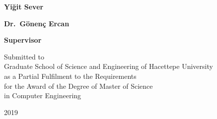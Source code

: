 \documentclass[
12pt, %
english, %
onehalfspacing, %
nolistspacing, %
parskip, %
nohyperref, %
headsepline, %
consistentlayout, %
]{MastersDoctoralThesis} %
\author{Yiğit \textsc{Sever}} %
\newcommand{\titletitlesize}{\fontsize{16pt}{18pt}\selectfont}
\begin{document}
\frontmatter %

\pagestyle{plain} %


\begin{titlepage}
\begin{center}
\vspace*{2\baselineskip} %
{\bfseries \titletitlesize{\ttitle}\par} %
\vspace*{3\baselineskip} %
{\bfseries \titletitlesize{Çift Dilli Kelime Temsilleri ile Sözlük Eşlenmesi}\par} %
\vspace*{3\baselineskip} %
{\bfseries Yiğit Sever\par}
\vspace*{3\baselineskip} %
{\bfseries Dr.~Gönenç Ercan\par} %
{\bfseries Supervisor}

\vspace*{3\baselineskip} %

Submitted to\\
Graduate School of Science and Engineering of Hacettepe University\\
as a Partial Fulfilment to the Requirements\\
for the Award of the Degree of Master of Science\\
in Computer Engineering

\vspace*{3\baselineskip} %

2019

\end{center}
\end{titlepage}

\end{document}

